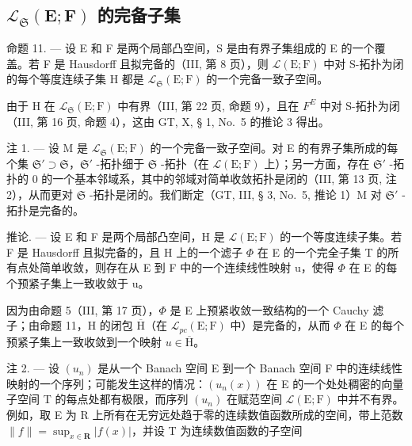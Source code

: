 \subsection{\texorpdfstring{\(\mathcal{L}_{\mathfrak{S}}(\mathbf{E};\mathbf{F})\) 的完备子集}{\textbackslash mathcal\{L\}\_\{\textbackslash mathfrak\{S\}\}(\textbackslash mathbf\{E\};\textbackslash mathbf\{F\}) 的完备子集}}

命题 11. --- 设 E 和 F 是两个局部凸空间，S 是由有界子集组成的 E 的一个覆盖。若 F 是 Hausdorff 且拟完备的（III, 第 8 页），则 \(\mathcal{L}(\mathrm{E};\mathrm{F})\) 中对 S-拓扑为闭的每个等度连续子集 H 都是 \(\mathcal{L}_{\mathfrak{S}}(\mathrm{E};\mathrm{F})\) 的一个完备一致子空间。

由于 H 在 \(\mathcal{L}_{\mathfrak{S}}(\mathrm{E};\mathrm{F})\) 中有界（III, 第 22 页, 命题 9），且在 \(F^{E}\) 中对 S-拓扑为闭（III, 第 16 页, 命题 4），这由 GT, X, § 1, No.~5 的推论 3 得出。

注 1. --- 设 M 是 \(\mathcal{L}_{\mathfrak{S}}(\mathrm{E};\mathrm{F})\) 的一个完备一致子空间。对 E 的有界子集所成的每个集 \(\mathfrak{S}' \supset \mathfrak{S}\)，\(\mathfrak{S}'\) -拓扑细于 \(\mathfrak{S}\) -拓扑（在 \(\mathcal{L}(\mathrm{E};\mathrm{F})\) 上）；另一方面，存在 \(\mathfrak{S}'\) -拓扑的 0 的一个基本邻域系，其中的邻域对简单收敛拓扑是闭的（III, 第 13 页, 注 2），从而更对 \(\mathfrak{S}\) -拓扑是闭的。我们断定（GT, III, § 3, No.~5, 推论 1）M 对 \(\mathfrak{S}'\) -拓扑是完备的。

推论. --- 设 E 和 F 是两个局部凸空间，H 是 \(\mathcal{L}(\mathrm{E};\mathrm{F})\) 的一个等度连续子集。若 F 是 Hausdorff 且拟完备的，且 H 上的一个滤子 \(\Phi\) 在 E 的一个完全子集 T 的所有点处简单收敛，则存在从 E 到 F 中的一个连续线性映射 u，使得 \(\Phi\) 在 E 的每个预紧子集上一致收敛于 u。

因为由命题 5（III, 第 17 页），\(\Phi\) 是 E 上预紧收敛一致结构的一个 Cauchy 滤子；由命题 11，H 的闭包 \(\overline{\mathrm{H}}\)（在 \(\mathcal{L}_{pc}(\mathrm{E};\mathrm{F})\) 中）是完备的，从而 \(\Phi\) 在 E 的每个预紧子集上一致收敛到一个映射 \(u\in \overline{\mathrm{H}}\)。

注 2. --- 设 \((u_{n})\) 是从一个 Banach 空间 E 到一个 Banach 空间 F 中的连续线性映射的一个序列；可能发生这样的情况：\((u_{n}(x))\) 在 E 的一个处处稠密的向量子空间 T 的每点处都有极限，而序列 \((u_{n})\) 在赋范空间 \(\mathcal{L}(\mathrm{E};\mathrm{F})\) 中并不有界。例如，取 E 为 R 上所有在无穷远处趋于零的连续数值函数所成的空间，带上范数 \(\|f\| = \sup_{x \in \mathbf{R}} |f(x)|\)，并设 T 为连续数值函数的子空间

